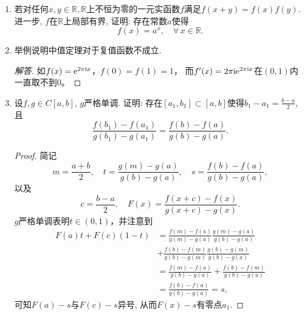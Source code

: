 \begin{1a}
\begin{enumerate}
\begin{proof}
    (3) 结合(i),\,(ii)。特别地，取$x={\rm e},y=\ln x$得到$\psi(x)=\psi({\rm e})\ln x$。
\end{proof}
\item 若对任何\(x,y\in\mathbb{R},\mathbb{R}\)上不恒为零的一元实函数\(f\)满足\(f(x+y)=f(x)f(y)\). 
进一步, \(f\)在\(\mathbb{R}\)上局部有界, 证明: 存在常数\(a\)使得
\[f(x)=a^x,\quad\forall\,x\in\mathbb{R}.\]
\item 举例说明中值定理对于复值函数不成立.
\begin{proof}[解答]
    如\(f(x)=\mathrm{e}^{2\pi{\rm i}x}\)，\(f(0)=f(1)=1\)，
    而\(f'(x)=2\pi{\rm i}\mathrm{e}^{2\pi{\rm i}x}\)在$(0,1)$内一直取不到\(0\)。
\end{proof}
\item 设\(f,g\in C[a,b]\), \(g\)严格单调. 证明: 存在\([a_1,b_1]\subset [a,b]\)使得\(b_1-a_1=\frac{b-a}{2}\), 且
\[\frac{f(b_1)-f(a_1)}{g(b_1)-g(a_1)}=\frac{f(b)-f(a)}{g(b)-g(a)}.\]
\begin{proof}
简记
\[m=\frac{a+b}{2},\quad t=\frac{g(m)-g(a)}{g(b)-g(a)},
\quad s=\frac{f(b)-f(a)}{g(b)-g(a)},\]
以及
\[c=\frac{b-a}{2}, \quad F(x)=\frac{f(x+c)-f(x)}{g(x+c)-g(x)}.\]
$g$严格单调表明$t\in(0,1)$，并注意到\begin{align*}
    F(a)t+F(c)(1-t)
    &=\frac{f(m)-f(a)}{g(m)-g(a)}\frac{g(m)-g(a)}{g(b)-g(a)}\\
    &+\frac{f(b)-f(m)}{g(b)-g(m)}\frac{g(b)-g(m)}{g(b)-g(a)}\\
    &=\frac{f(m)-f(a)}{g(b)-g(a)}+\frac{f(b)-f(m)}{g(b)-g(a)}\\
    &=\frac{f(b)-f(a)}{g(b)-g(a)}=s,
\end{align*}
可知\(F(a)-s\)与\(F(c)-s\)异号, 从而$F(x)-s$有零点$a_1$.
\end{proof}
\end{enumerate}
\end{1a}
